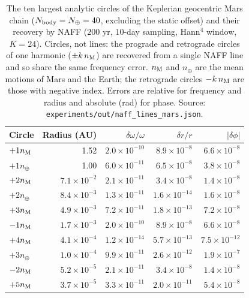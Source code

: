 \begin{table}[tb]
\caption{The ten largest analytic circles of the Keplerian geocentric Mars chain
($N_{\rm body}=N_\oplus=40$, excluding the static offset) and their recovery by NAFF
($200$ yr, $10$-day sampling, Hann$^4$ window, $K=24$). Circles, not lines:
the prograde and retrograde circles of one harmonic ($\pm k\,n_{\rm M}$) are
recovered from a single NAFF line and so share the same frequency error. $n_{\rm M}$ and
$n_\oplus$ are the mean motions of Mars and the Earth; the retrograde circles
$-k\,n_{\rm M}$ are those with negative index. Errors are relative for frequency and radius and
absolute (rad) for phase. Source: \texttt{experiments/out/naff\_lines\_mars.json}.}
\label{tab:naff-lines}
\begin{ruledtabular}
\footnotesize\setlength{\tabcolsep}{3pt}
\begin{tabular}{lrrrr}
Circle & Radius (AU) & $\delta\omega/\omega$ & $\delta r/r$ & $|\delta\phi|$\\
\hline
$+1 n_{\rm M}$ & 1.52 & $2.0\times10^{-10}$ & $8.9\times10^{-8}$ & $6.6\times10^{-8}$ \\
$+1 n_\oplus$ & 1.00 & $6.0\times10^{-11}$ & $6.5\times10^{-8}$ & $3.8\times10^{-8}$ \\
$+2 n_{\rm M}$ & $7.1\times10^{-2}$ & $2.1\times10^{-11}$ & $3.4\times10^{-8}$ & $1.4\times10^{-8}$ \\
$+2 n_\oplus$ & $8.4\times10^{-3}$ & $1.3\times10^{-11}$ & $1.6\times10^{-14}$ & $1.6\times10^{-8}$ \\
$+3 n_{\rm M}$ & $4.9\times10^{-3}$ & $7.2\times10^{-11}$ & $1.8\times10^{-13}$ & $7.2\times10^{-8}$ \\
$-1 n_{\rm M}$ & $1.7\times10^{-3}$ & $2.0\times10^{-10}$ & $8.9\times10^{-8}$ & $6.6\times10^{-8}$ \\
$+4 n_{\rm M}$ & $4.1\times10^{-4}$ & $1.2\times10^{-14}$ & $5.7\times10^{-13}$ & $7.5\times10^{-12}$ \\
$+3 n_\oplus$ & $1.0\times10^{-4}$ & $9.9\times10^{-11}$ & $2.6\times10^{-12}$ & $1.9\times10^{-7}$ \\
$-2 n_{\rm M}$ & $5.2\times10^{-5}$ & $2.1\times10^{-11}$ & $3.4\times10^{-8}$ & $1.4\times10^{-8}$ \\
$+5 n_{\rm M}$ & $3.7\times10^{-5}$ & $3.3\times10^{-11}$ & $2.0\times10^{-11}$ & $5.4\times10^{-8}$ \\
\end{tabular}
\end{ruledtabular}
\end{table}


